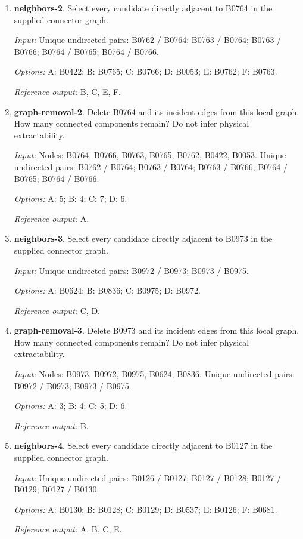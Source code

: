 \begin{enumerate}
\item \textbf{neighbors-2}. Select every candidate directly adjacent to B0764 in the supplied connector graph.\par {\small \textit{Input:} Unique undirected pairs: B0762 / B0764; B0763 / B0764; B0763 / B0766; B0764 / B0765; B0764 / B0766. \par\textit{Options:} A: B0422; B: B0765; C: B0766; D: B0053; E: B0762; F: B0763. \par\textit{Reference output:} B, C, E, F.}
\item \textbf{graph-removal-2}. Delete B0764 and its incident edges from this local graph. How many connected components remain? Do not infer physical extractability.\par {\small \textit{Input:} Nodes: B0764, B0766, B0763, B0765, B0762, B0422, B0053. Unique undirected pairs: B0762 / B0764; B0763 / B0764; B0763 / B0766; B0764 / B0765; B0764 / B0766. \par\textit{Options:} A: 5; B: 4; C: 7; D: 6. \par\textit{Reference output:} A.}
\item \textbf{neighbors-3}. Select every candidate directly adjacent to B0973 in the supplied connector graph.\par {\small \textit{Input:} Unique undirected pairs: B0972 / B0973; B0973 / B0975. \par\textit{Options:} A: B0624; B: B0836; C: B0975; D: B0972. \par\textit{Reference output:} C, D.}
\item \textbf{graph-removal-3}. Delete B0973 and its incident edges from this local graph. How many connected components remain? Do not infer physical extractability.\par {\small \textit{Input:} Nodes: B0973, B0972, B0975, B0624, B0836. Unique undirected pairs: B0972 / B0973; B0973 / B0975. \par\textit{Options:} A: 3; B: 4; C: 5; D: 6. \par\textit{Reference output:} B.}
\item \textbf{neighbors-4}. Select every candidate directly adjacent to B0127 in the supplied connector graph.\par {\small \textit{Input:} Unique undirected pairs: B0126 / B0127; B0127 / B0128; B0127 / B0129; B0127 / B0130. \par\textit{Options:} A: B0130; B: B0128; C: B0129; D: B0537; E: B0126; F: B0681. \par\textit{Reference output:} A, B, C, E.}

\end{enumerate}
